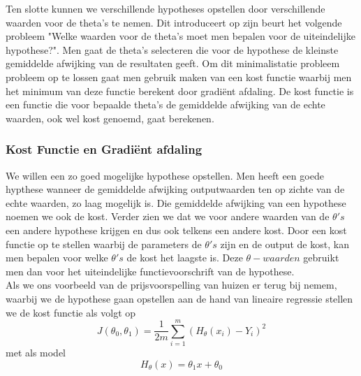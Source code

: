 Ten slotte kunnen we verschillende hypotheses opstellen door verschillende waarden voor de theta's te nemen. Dit introduceert op zijn beurt het volgende probleem "Welke waarden voor de theta's moet men bepalen voor de uiteindelijke hypothese?". Men gaat de theta's selecteren die voor de hypothese de kleinste gemiddelde afwijking van de resultaten geeft. Om dit minimalistatie probleem probleem op te lossen gaat men gebruik maken van een kost functie  waarbij men het minimum van deze functie berekent door gradi\"ent afdaling. De kost functie is een functie die voor bepaalde theta's de gemiddelde afwijking van de echte waarden, ook wel kost genoemd, gaat berekenen.  


\subsubsection{Kost Functie en Gradi\"ent afdaling}\label{Kost Functie en Gradule afdaling}

We willen een zo goed mogelijke hypothese opstellen. Men heeft een goede hypthese wanneer de gemiddelde afwijking outputwaarden ten op zichte van de echte waarden, zo laag mogelijk is. Die gemiddelde afwijking van een hypothese noemen we ook de kost. Verder zien we dat we voor andere waarden van de $\theta's$ een andere hypothese krijgen en dus ook telkens een andere kost. Door een kost functie op te stellen waarbij de parameters de $\theta's$ zijn en de output de kost, kan men bepalen voor welke $\theta's$ de kost het laagste is. Deze $\theta-waarden$ gebruikt men dan voor het uiteindelijke functievoorschrift van de hypothese. \\

Als we ons voorbeeld van de prijsvoorspelling van huizen er terug bij nemem, waarbij we de hypothese gaan opstellen aan de hand van lineaire regressie stellen we de kost functie als volgt op\\
\[J(\theta_{0},\theta_{1}) = \frac{1}{2m}\sum_{i=1}^{m} (H_{\theta}(x_i) - Y_i )^2\]
\newline
met als model 
\newline
\[H_{\theta}(x) = \theta_{1}x + \theta_{0}\]
\newline

